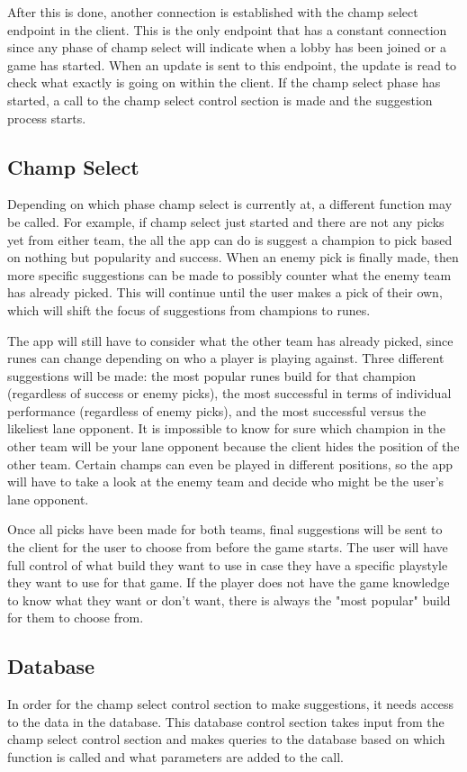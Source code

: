 \documentclass[10pt,twocolumn]{article}
\begin{document}
After this is done, another connection is established with the champ select endpoint in the client.
This is the only endpoint that has a constant connection since any phase of champ select will indicate when a lobby has been joined or a game has started.
When an update is sent to this endpoint, the update is read to check what exactly is going on within the client.
If the champ select phase has started, a call to the champ select control section is made and the suggestion process starts. 

\subsection{Champ Select}
Depending on which phase champ select is currently at, a different function may be called.
For example, if champ select just started and there are not any picks yet from either team, the all the app can do is suggest a champion to pick based on nothing but popularity and success.
When an enemy pick is finally made, then more specific suggestions can be made to possibly counter what the enemy team has already picked.
This will continue until the user makes a pick of their own, which will shift the focus of suggestions from champions to runes.

The app will still have to consider what the other team has already picked, since runes can change depending on who a player is playing against.
Three different suggestions will be made: the most popular runes build for that champion (regardless of success or enemy picks), the most successful in terms of individual performance (regardless of enemy picks), and the most successful versus the likeliest lane opponent.
It is impossible to know for sure which champion in the other team will be your lane opponent because the client hides the position of the other team.
Certain champs can even be played in different positions, so the app will have to take a look at the enemy team and decide who might be the user's lane opponent.

Once all picks have been made for both teams, final suggestions will be sent to the client for the user to choose from before the game starts.
The user will have full control of what build they want to use in case they have a specific playstyle they want to use for that game.
If the player does not have the game knowledge to know what they want or don't want, there is always the "most popular" build for them to choose from.

\subsection{Database}
In order for the champ select control section to make suggestions, it needs access to the data in the database.
This database control section takes input from the champ select control section and makes queries to the database based on which function is called and what parameters are added to the call.
\end{document}
